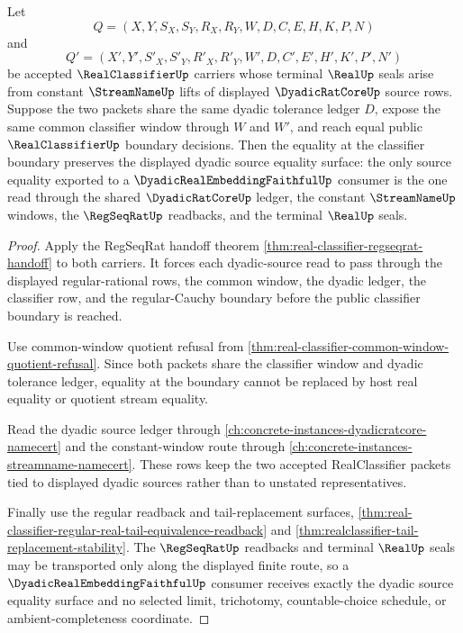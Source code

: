 \begin{theorem}
\label{thm:realclassifier-dyadic-source-embedding-faithfulness}
Let
$$
Q=(X,Y,S_X,S_Y,R_X,R_Y,W,D,C,E,H,K,P,N)
$$
and
$$
Q'=(X',Y',S'_X,S'_Y,R'_X,R'_Y,W',D,C',E',H',K',P',N')
$$
be accepted $\RealClassifierUp$ carriers whose terminal $\RealUp$ seals arise from constant $\StreamNameUp$ lifts of displayed $\DyadicRatCoreUp$ source rows. Suppose the two packets share the same dyadic tolerance ledger $D$, expose the same common classifier window through $W$ and $W'$, and reach equal public $\RealClassifierUp$ boundary decisions. Then the equality at the classifier boundary preserves the displayed dyadic source equality surface: the only source equality exported to a $\DyadicRealEmbeddingFaithfulUp$ consumer is the one read through the shared $\DyadicRatCoreUp$ ledger, the constant $\StreamNameUp$ windows, the $\RegSeqRatUp$ readbacks, and the terminal $\RealUp$ seals.
\end{theorem}
\begin{proof}
Apply the RegSeqRat handoff theorem \autoref{thm:real-classifier-regseqrat-handoff} to both carriers. It forces each dyadic-source read to pass through the displayed regular-rational rows, the common window, the dyadic ledger, the classifier row, and the regular-Cauchy boundary before the public classifier boundary is reached.

Use common-window quotient refusal from \autoref{thm:real-classifier-common-window-quotient-refusal}. Since both packets share the classifier window and dyadic tolerance ledger, equality at the boundary cannot be replaced by host real equality or quotient stream equality.

Read the dyadic source ledger through \autoref{ch:concrete-instances-dyadicratcore-namecert} and the constant-window route through \autoref{ch:concrete-instances-streamname-namecert}. These rows keep the two accepted RealClassifier packets tied to displayed dyadic sources rather than to unstated representatives.

Finally use the regular readback and tail-replacement surfaces, \autoref{thm:real-classifier-regular-real-tail-equivalence-readback} and \autoref{thm:realclassifier-tail-replacement-stability}. The $\RegSeqRatUp$ readbacks and terminal $\RealUp$ seals may be transported only along the displayed finite route, so a $\DyadicRealEmbeddingFaithfulUp$ consumer receives exactly the dyadic source equality surface and no selected limit, trichotomy, countable-choice schedule, or ambient-completeness coordinate.
\end{proof}

